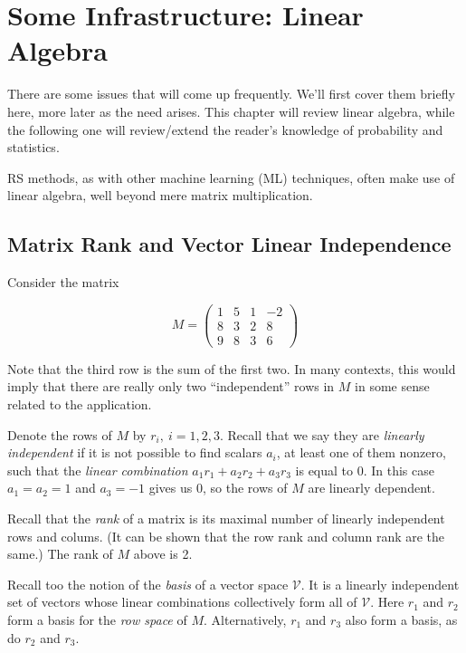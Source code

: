 \chapter{Some Infrastructure: Linear Algebra} 
\label{chap:linalg}  

There are some issues that will come up frequently.  We'll first cover them
briefly here, more later as the need arises.  This chapter will review
linear algebra, while the following one will review/extend the reader's
knowledge of probability and statistics.

RS methods, as with other machine learning (ML) techniques, often make
use of linear algebra, well beyond mere matrix multiplication. 

\section{Matrix Rank and Vector Linear Independence}

Consider the matrix

\begin{equation}
\label{rankex1}
M = 
\left (
\begin{array}{rrrr}
1 & 5 & 1 & -2 \\
8 & 3 & 2 & 8 \\
9 & 8 & 3 & 6 
\end{array}
\right )
\end{equation}

Note that the third row is the sum of the first two.  In many contexts,
this would imply that there are really only two ``independent'' rows in
$M$ in some sense related to the application.  

Denote the rows of $M$ by $r_i, ~ i = 1,2,3$.  Recall that we say they
are \textit{linearly independent} if it is not possible to find scalars
$a_i$, at least one of them nonzero, such that the \textit{linear
combination} $a_1 r_1 + a_2 r_2 + a_3 r_3$ is equal to 0.  In this case
$a_1 = a_2 = 1$ and $a_3 = -1$ gives us 0, so the rows of $M$ are
linearly dependent.

Recall that the \textit{rank} of a matrix is its maximal number of
linearly independent rows and colums.  (It can be shown that the row
rank and column rank are the same.)  The rank of $M$ above is 2.

Recall too the notion of the \textit{basis} of a vector space
$\mathcal{V}$.  It is a linearly independent set of vectors whose linear
combinations collectively form all of $\mathcal{V}$.  Here  $r_1$ and
$r_2$ form a basis for the \textit{row space} of $M$.  Alternatively,
$r_1$ and $r_3$ also form a basis, as do $r_2$ and $r_3$.

